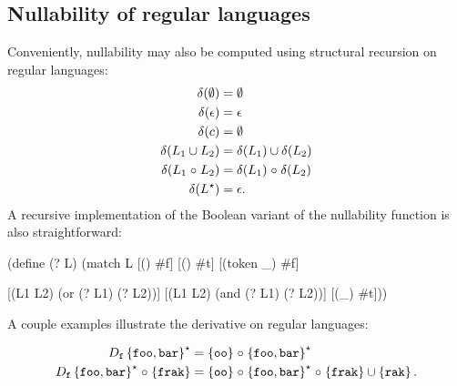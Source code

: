 \subsection{Nullability of regular languages}
Conveniently, nullability may also be computed using structural recursion on
regular languages:
\begin{align*}
  \delta(\emptyset) &= \emptyset
  \\
  \delta(\epsilon) &= \epsilon
  \\
  \delta(c) &= \emptyset
  \\
  \delta(L_1 \cup L_2) &= \delta(L_1) \cup \delta(L_2)
  \\
  \delta(L_1 \mathrel{\circ} L_2) &= \delta(L_1) \mathrel{\circ} \delta(L_2)
  \\
  \delta(L^\star) &= \epsilon
  \text.
\end{align*}
%
A recursive implementation of the Boolean variant of the nullability function
is also straightforward:
\begin{code}
(define (\ttdelta? L)
  (match L
    [(\ttempty)         #f]
    [(\ttepsilon)         #t]    
    [(token _)   #f]

    [(\ttcup L1 L2)   (or  (\ttdelta? L1) (\ttdelta? L2))]
    [(\ttcirc L1 L2)   (and (\ttdelta? L1) (\ttdelta? L2))]
    [(\ttstar _)       #t])) \end{code}



\begin{example}
A couple examples illustrate the derivative on regular languages:

{
\small
\begin{align*}
 D_{\tt f}\left\{{\tt foo},{\tt bar}\right\}^\star &= 
 \left\{\tt oo\right\} \mathrel{\circ} 
 \left\{{\tt foo},{\tt bar}\right\}^\star
 \\
 D_{\tt f}\left\{{\tt foo},{\tt bar}\right\}^\star \mathrel{\circ} \left\{\tt frak\right\} &= 
 \left\{\tt oo\right\} \mathrel{\circ} 
 \left\{{\tt foo},{\tt bar}\right\}^\star 
 \mathrel{\circ} \left\{\tt frak\right\}
 \cup
 \left\{\tt rak\right\}
 \text.
\end{align*}
}
%
\end{example}




